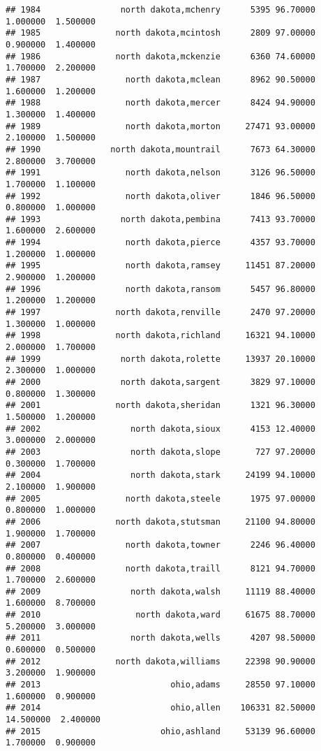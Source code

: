 \documentclass[
]{article}
\begin{document}
\begin{verbatim}
## 1984                north dakota,mchenry      5395 96.70000  1.000000  1.500000
## 1985               north dakota,mcintosh      2809 97.00000  0.900000  1.400000
## 1986               north dakota,mckenzie      6360 74.60000  1.700000  2.200000
## 1987                 north dakota,mclean      8962 90.50000  1.600000  1.200000
## 1988                 north dakota,mercer      8424 94.90000  1.300000  1.400000
## 1989                 north dakota,morton     27471 93.00000  2.100000  1.500000
## 1990              north dakota,mountrail      7673 64.30000  2.800000  3.700000
## 1991                 north dakota,nelson      3126 96.50000  1.700000  1.100000
## 1992                 north dakota,oliver      1846 96.50000  0.800000  1.000000
## 1993                north dakota,pembina      7413 93.70000  1.600000  2.600000
## 1994                 north dakota,pierce      4357 93.70000  1.200000  1.000000
## 1995                 north dakota,ramsey     11451 87.20000  2.900000  1.200000
## 1996                 north dakota,ransom      5457 96.80000  1.200000  1.200000
## 1997               north dakota,renville      2470 97.20000  1.300000  1.000000
## 1998               north dakota,richland     16321 94.10000  2.000000  1.700000
## 1999                north dakota,rolette     13937 20.10000  2.300000  1.000000
## 2000                north dakota,sargent      3829 97.10000  0.800000  1.300000
## 2001               north dakota,sheridan      1321 96.30000  1.500000  1.200000
## 2002                  north dakota,sioux      4153 12.40000  3.000000  2.000000
## 2003                  north dakota,slope       727 97.20000  0.300000  1.700000
## 2004                  north dakota,stark     24199 94.10000  2.100000  1.900000
## 2005                 north dakota,steele      1975 97.00000  0.800000  1.000000
## 2006               north dakota,stutsman     21100 94.80000  1.900000  1.700000
## 2007                 north dakota,towner      2246 96.40000  0.800000  0.400000
## 2008                 north dakota,traill      8121 94.70000  1.700000  2.600000
## 2009                  north dakota,walsh     11119 88.40000  1.600000  8.700000
## 2010                   north dakota,ward     61675 88.70000  5.200000  3.000000
## 2011                  north dakota,wells      4207 98.50000  0.600000  0.500000
## 2012               north dakota,williams     22398 90.90000  3.200000  1.900000
## 2013                          ohio,adams     28550 97.10000  1.600000  0.900000
## 2014                          ohio,allen    106331 82.50000 14.500000  2.400000
## 2015                        ohio,ashland     53139 96.60000  1.700000  0.900000

\end{verbatim}
\end{document}
